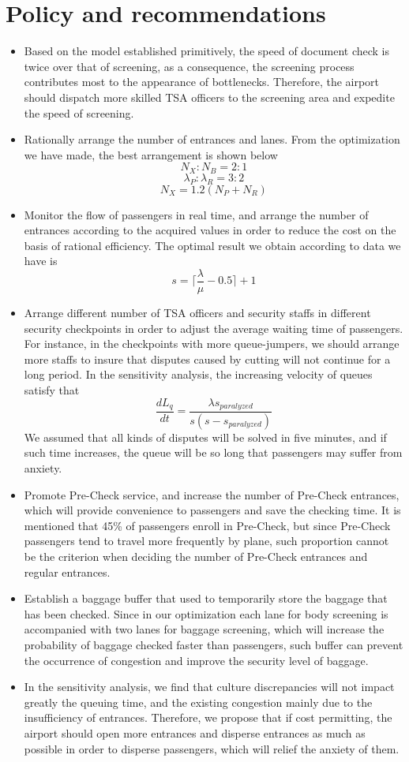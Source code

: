 \documentclass{mcmthesis}
\begin{document}
	\section{Policy and recommendations}
	\begin{itemize}
		\item Based on the model established primitively, the speed of document check is twice over that of screening, as a consequence, the screening process contributes most to the appearance of bottlenecks. Therefore, the airport should dispatch more skilled TSA officers to the screening area and expedite the speed of screening.
		\item Rationally arrange the number of entrances and lanes. From the optimization we have made, the best arrangement is shown below
		$$N_X:N_B=2:1$$
		$$\lambda_P:\lambda_R=3:2$$
		$$N_X=1.2(N_P+N_R)$$
		\item Monitor the flow of passengers in real time, and arrange the number of entrances according to the acquired values in order to reduce the cost on the basis of rational efficiency. The optimal result we obtain according to data we have is
		$$s=\lceil\frac{\lambda}{\mu}-0.5\rceil+1$$
		\item Arrange different number of TSA officers and security staffs in different security checkpoints in order to adjust the average waiting time of passengers. For instance, in the checkpoints with more queue-jumpers, we should arrange more staffs to insure that disputes caused by cutting will not continue for a long period. In the sensitivity analysis, the increasing velocity of queues satisfy that
		$$\frac{dL_q}{dt}=\frac{\lambda s_{paralyzed}}{s(s-s_{paralyzed})}$$
		We assumed that all kinds of disputes will be solved in five minutes, and if such time increases, the queue will be so long that passengers may suffer from anxiety.
		\item Promote Pre-Check service, and increase the number of Pre-Check entrances, which will provide convenience to passengers and save the checking time. It is mentioned that 45\% of passengers enroll in Pre-Check, but since Pre-Check passengers tend to travel more frequently by plane, such proportion cannot be the criterion when deciding the number of Pre-Check entrances and regular entrances.
		\item Establish a baggage buffer that used to temporarily store the baggage that has been checked. Since in our optimization each lane for body screening is accompanied with two lanes for baggage screening, which will increase the probability of baggage checked faster than passengers, such buffer can prevent the occurrence of congestion and improve the security level of baggage.
		\item In the sensitivity analysis, we find that culture discrepancies will not impact greatly the queuing time, and the existing congestion mainly due to the insufficiency of entrances. Therefore, we propose that if cost permitting, the airport should open more entrances and disperse entrances as much as possible in order to disperse passengers, which will relief the anxiety of them.
	\end{itemize}
\end{document}
